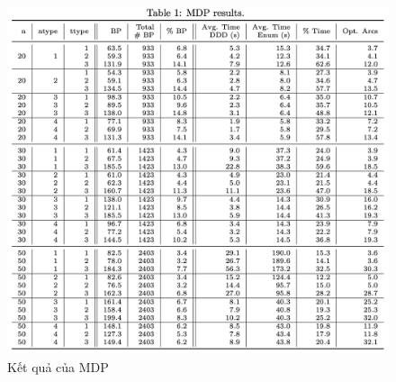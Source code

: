 \documentclass[../main.tex]{subfiles}
\begin{document}
\begin{figure}
\centering
\includegraphics{images/Table1.png}
\caption{Kết quả của MDP}
\label{table:mdp1}
\end{figure}
\end{document}
